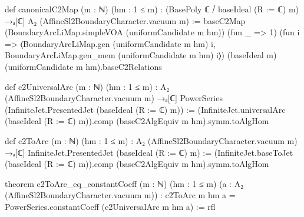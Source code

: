 \begin{leancode}
def canonicalC2Map (m : ℕ) (hm : 1 ≤ m) :
    (BasePoly ℂ ⧸ baseIdeal (R := ℂ) m) →ₐ[ℂ] A₂ (AffineSl2BoundaryCharacter.vacuum m) :=
  baseC2Map (BoundaryArcLiMap.simpleVOA (uniformCandidate m hm)) (fun _ => 1)
    (fun i => ⟨BoundaryArcLiMap.gen (uniformCandidate m hm) i,
      BoundaryArcLiMap.gen_mem (uniformCandidate m hm) i⟩)
    (baseIdeal m) (uniformCandidate m hm).baseC2Relations

def c2UniversalArc (m : ℕ) (hm : 1 ≤ m) :
    A₂ (AffineSl2BoundaryCharacter.vacuum m) →ₐ[ℂ]
      PowerSeries (InfiniteJet.PresentedJet (baseIdeal (R := ℂ) m)) :=
  (InfiniteJet.universalArc (baseIdeal (R := ℂ) m)).comp (baseC2AlgEquiv m hm).symm.toAlgHom

def c2ToArc (m : ℕ) (hm : 1 ≤ m) :
    A₂ (AffineSl2BoundaryCharacter.vacuum m) →ₐ[ℂ]
      InfiniteJet.PresentedJet (baseIdeal (R := ℂ) m) :=
  (InfiniteJet.baseToJet (baseIdeal (R := ℂ) m)).comp (baseC2AlgEquiv m hm).symm.toAlgHom

theorem c2ToArc_eq_constantCoeff (m : ℕ) (hm : 1 ≤ m)
    (a : A₂ (AffineSl2BoundaryCharacter.vacuum m)) :
    c2ToArc m hm a = PowerSeries.constantCoeff (c2UniversalArc m hm a) := rfl
\end{leancode}

